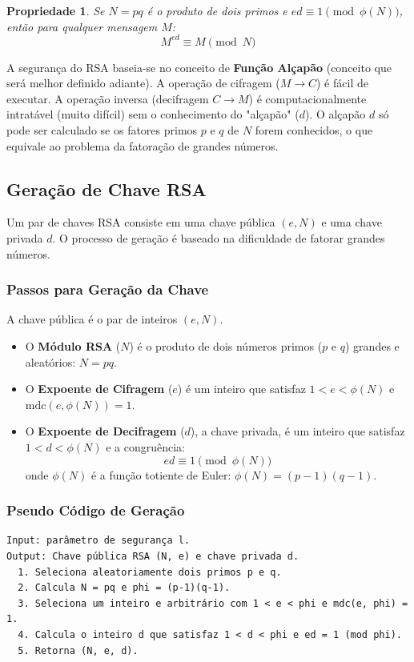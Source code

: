 \documentclass{article}
\theoremstyle{definicao_estilo}
\newtheorem{propriedade}{Propriedade}
\begin{document}
\begin{propriedade}
Se $N=pq$ é o produto de dois primos e $ed \equiv 1 \pmod{\phi(N)}$, então para qualquer mensagem $M$:
$$ M^{ed} \equiv M \pmod N $$
\end{propriedade}

A segurança do RSA baseia-se no conceito de \textbf{Função Alçapão} (conceito que será melhor definido adiante). A operação de cifragem ($M \to C$) é fácil de executar. A operação inversa (decifragem $C \to M$) é computacionalmente intratável (muito difícil) sem o conhecimento do "alçapão" ($d$). O alçapão $d$ só pode ser calculado se os fatores primos $p$ e $q$ de $N$ forem conhecidos, o que equivale ao problema da fatoração de grandes números.

\subsection{Geração de Chave RSA}
Um par de chaves RSA consiste em uma chave pública $(e,N)$ e uma chave privada $d$. O processo de geração é baseado na dificuldade de fatorar grandes números.

\subsubsection{Passos para Geração da Chave}
A chave pública é o par de inteiros $(e, N)$.
\begin{itemize}
\item O \textbf{Módulo RSA} ($N$) é o produto de dois números primos ($p$ e $q$) grandes e aleatórios: $N = pq$.
\item O \textbf{Expoente de Cifragem} ($e$) é um inteiro que satisfaz $1 < e < \phi(N)$ e $\text{mdc}(e, \phi(N)) = 1$.
\item O \textbf{Expoente de Decifragem} ($d$), a chave privada, é um inteiro que satisfaz $1 < d < \phi(N)$ e a congruência:
$$ ed \equiv 1 \pmod{\phi (N)} $$
onde $\phi(N)$ é a função totiente de Euler: $\phi(N) = (p-1)(q-1)$.
\end{itemize}

\subsubsection{Pseudo Código de Geração}
\begin{verbatim}
Input: parâmetro de segurança l.
Output: Chave pública RSA (N, e) e chave privada d.
  1. Seleciona aleatoriamente dois primos p e q.
  2. Calcula N = pq e phi = (p-1)(q-1).
  3. Seleciona um inteiro e arbitrário com 1 < e < phi e mdc(e, phi) = 1.
  4. Calcula o inteiro d que satisfaz 1 < d < phi e ed = 1 (mod phi).
  5. Retorna (N, e, d).
\end{verbatim}
\end{document}
